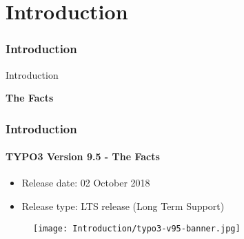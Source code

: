 %

\section{Introduction}
\begin{frame}[fragile]
	\frametitle{Introduction}

	\begin{center}\huge{Introduction}\end{center}
	\begin{center}\huge{\color{typo3darkgrey}\textbf{The Facts}}\end{center}

\end{frame}


\begin{frame}[fragile]
	\frametitle{Introduction}
	\framesubtitle{TYPO3 Version 9.5 - The Facts}

	\begin{itemize}
		\item Release date: 02 October 2018
		\item Release type: LTS release (Long Term Support)
	\end{itemize}

	\begin{figure}
		\texttt{[image: Introduction/typo3-v95-banner.jpg]}
	\end{figure}

\end{frame}


